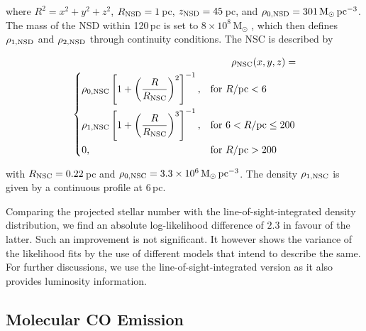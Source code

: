 \documentclass[doublespace,draft,nopageskip]{VTthesis} %
\newcommand{\mrm}[1]{\mathrm{#1}}
\begin{document}
\begin{appendices}
	\noindent where $R^2 = x^2 + y^2 + z^2$, $R_{\rm NSD} = 1$\,pc, $z_{\rm NSD} = 45$\,pc, and $\rho_{0,\rm NSD} = 301\,\mrm{M_{\odot}\,pc^{-3}}$.
	The mass of the NSD within 120\,pc is set to $8 \times 10^{8}\,\mrm{M_{\odot}}$ \citep{Launhardt2002_NB}, which then defines $\rho_{1,\rm NSD}$ and $\rho_{2,\rm NSD}$ through continuity conditions. The NSC is described by
	
	\begin{eqnarray}
		\rho_{\rm NSC}(x,y,z) = & \\\nonumber \left \{
		\begin{aligned}
			&\rho_{0,\rm NSC} \left[1 + \left(\frac{R}{R_{\rm NSC}}\right)^2\right]^{-1}, && \text{for}\ R/\mrm{pc} < 6 \\
			&\rho_{1,\rm NSC} \left[1 + \left(\frac{R}{R_{\rm NSC}}\right)^3\right]^{-1}, && \text{for}\ 6 < R/\mrm{pc} \leq 200 \\
			&0, && \text{for}\ R/\mrm{pc} > 200 
		\end{aligned} \right. &
		\label{eq:NSC_formula}
	\end{eqnarray} 
	
	\noindent with $R_{\rm NSC} = 0.22$\,pc and $\rho_{0,\rm NSC} = 3.3 \times 10^{6}\,\mrm{M_{\odot}\,pc^{-3}}$.
	The density $\rho_{1,\rm NSC}$ is given by a continuous profile at 6\,pc.
	
	Comparing the projected stellar number with the line-of-sight-integrated density distribution, we find an absolute log-likelihood difference of $2.3$ in favour of the latter.
	Such an improvement is not significant.
	It however shows the variance of the likelihood fits by the use of different models that intend to describe the same.
	For further discussions, we use the line-of-sight-integrated version as it also provides luminosity information.
	
	
	\subsection{Molecular CO Emission}
	

\end{appendices}
\end{document}
